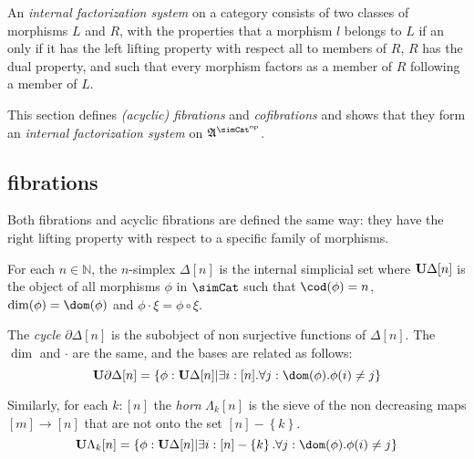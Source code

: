 \documentclass{tac}
\newcommand\hide[1]{}
\newcommand\set[1]{\left\{#1\right\}}
\newcommand\N{\mathbb N}
\newcommand\dual{^{\mathrm{op}}}
\newcommand\s{^{\simCat\dual}}
\newcommand\of{:}
\newcommand\simplex\Delta
\newcommand\cycle{\partial\Delta}
\newcommand\horn\Lambda
\newcommand\ambient{\mathfrak A}
\begin{document}
\begin{definition} An \emph{internal factorization system} on a category consists of two classes of morphisms $L$ and $R$, with the properties that a morphism $l$ belongs to $L$ if an only if it has the left lifting property with respect all to members of $R$, $R$ has the dual property, and such that every morphism factors as a member of $R$ following a member of $L$.\end{definition}

This section defines \emph{(acyclic) fibrations} and \emph{cofibrations} and shows that they form an \emph{internal factorization system} on $\ambient\s$.

\subsection{fibrations}
\hide{ 

Idea: define Kan fibrations, define cofibrations, demonstrate the lifting properties. Move on happily.

New idea: go by factorization system.

1. The lifting properties of cofibrations
2. Factorization property

}
Both fibrations and acyclic fibrations are defined the same way: they have the right lifting property with respect to a specific family of morphisms.

\hide{ Add def. of sieve over $\simCat$
Wrong: I was calling it a sieve because I was thinking of the category of elements of $\simplex[n]$
$\ambient\s$ defined?
Member functions for internal simplicial objects?
 }
\begin{definition} For each $n\in\N$, the $n$-simplex $\simplex[n]$ is the internal simplicial set where $\base{\simplex[n]}$ is the object of all morphisms $\phi$ in $\simCat$ such that $\cod(\phi) = n$, $\dim(\phi) = \dom(\phi)$ and $\phi\cdot \xi = \phi\circ \xi$.

The \emph{cycle} $\cycle[n]$ is the subobject of non surjective functions of $\simplex[n]$. The $\dim$ and $\cdot$ are the same, and the bases are related as follows:
\[ \base{\cycle[n]} = \set{\phi\of\base{\simplex[n]}| \exists i\of[n].\forall j\of \dom(\phi).\phi(i)\neq j } \]

Similarly, for each $k\of[n]$ the \emph{horn} $\horn_k[n]$ is the sieve of the non decreasing maps $[m]\to [n]$ that are not onto the set $[n]-\set{k}$.
\[ \base{\horn_k[n]} = \set{\phi\of\base{\simplex[n]}| \exists i\of[n]-\set k.\forall j\of \dom(\phi).\phi(i)\neq j } \]

\end{definition}
\end{document}
